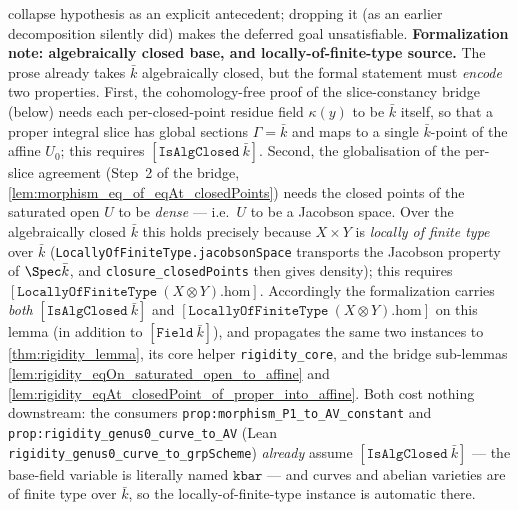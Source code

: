 \begin{lemma}
  collapse hypothesis as an explicit antecedent; dropping it (as an earlier decomposition
  silently did) makes the deferred goal unsatisfiable.
  \medskip
  \noindent\textbf{Formalization note: algebraically closed base, and locally-of-finite-type
  source.} The prose already takes \(\bar k\) algebraically closed, but the formal statement must
  \emph{encode} two properties. First, the cohomology-free proof of the slice-constancy bridge
  (below) needs each per-closed-point residue field \(\kappa(y)\) to be \(\bar k\) itself, so that a
  proper integral slice has global sections \(\Gamma = \bar k\) and maps to a single \(\bar k\)-point of
  the affine \(U_0\); this requires \([\mathtt{IsAlgClosed}\ \bar k]\). Second, the globalisation of the
  per-slice agreement (Step~2 of the bridge, \cref{lem:morphism_eq_of_eqAt_closedPoints}) needs the
  closed points of the saturated open \(U\) to be \emph{dense} --- i.e.\ \(U\) to be a Jacobson space.
  Over the algebraically closed \(\bar k\) this holds precisely because \(X \times Y\) is \emph{locally of
  finite type} over \(\bar k\) (\texttt{LocallyOfFiniteType.jacobsonSpace} transports the Jacobson
  property of \(\Spec \bar k\), and \texttt{closure\_closedPoints} then gives density); this requires
  \([\mathtt{LocallyOfFiniteType}\ (X \otimes Y).\mathrm{hom}]\). Accordingly the formalization carries
  \emph{both} \([\mathtt{IsAlgClosed}\ \bar k]\) and
  \([\mathtt{LocallyOfFiniteType}\ (X \otimes Y).\mathrm{hom}]\) on this lemma (in addition to
  \([\mathtt{Field}\ \bar k]\)), and propagates the same two instances to \cref{thm:rigidity_lemma},
  its core helper \texttt{rigidity\_core}, and the bridge sub-lemmas
  \cref{lem:rigidity_eqOn_saturated_open_to_affine} and
  \cref{lem:rigidity_eqAt_closedPoint_of_proper_into_affine}. Both cost nothing downstream: the
  consumers \texttt{prop:morphism_P1_to_AV_constant} and \texttt{prop:rigidity_genus0_curve_to_AV} (Lean
  \texttt{rigidity\_genus0\_curve\_to\_grpScheme}) \emph{already} assume
  \([\mathtt{IsAlgClosed}\ \bar k]\) --- the base-field variable is literally named \(\mathtt{kbar}\) ---
  and curves and abelian varieties are of finite type over \(\bar k\), so the
  locally-of-finite-type instance is automatic there.
\end{lemma}
